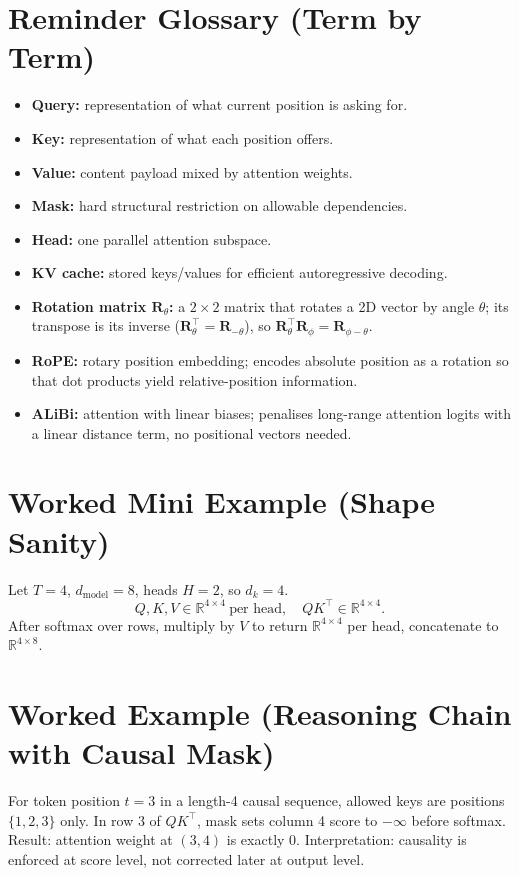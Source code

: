 \section*{Reminder Glossary (Term by Term)}
\begin{itemize}[leftmargin=1.5em]
  \item \textbf{Query:} representation of what current position is asking for.
  \item \textbf{Key:} representation of what each position offers.
  \item \textbf{Value:} content payload mixed by attention weights.
  \item \textbf{Mask:} hard structural restriction on allowable dependencies.
  \item \textbf{Head:} one parallel attention subspace.
  \item \textbf{KV cache:} stored keys/values for efficient autoregressive decoding.
  \item \textbf{Rotation matrix $\mathbf{R}_\theta$:} a $2\times2$ matrix that rotates a 2D vector by angle $\theta$; its transpose is its inverse ($\mathbf{R}_\theta^\top = \mathbf{R}_{-\theta}$), so $\mathbf{R}_\theta^\top \mathbf{R}_\phi = \mathbf{R}_{\phi-\theta}$.
  \item \textbf{RoPE:} rotary position embedding; encodes absolute position as a rotation so that dot products yield relative-position information.
  \item \textbf{ALiBi:} attention with linear biases; penalises long-range attention logits with a linear distance term, no positional vectors needed.
\end{itemize}

\section*{Worked Mini Example (Shape Sanity)}
Let $T=4$, $d_{\text{model}}=8$, heads $H=2$, so $d_k=4$.
\[
Q,K,V \in \mathbb{R}^{4\times 4}\ \text{per head},\quad QK^\top \in \mathbb{R}^{4\times 4}.
\]
After softmax over rows, multiply by $V$ to return $\mathbb{R}^{4\times 4}$ per head, concatenate to $\mathbb{R}^{4\times 8}$.

\section*{Worked Example (Reasoning Chain with Causal Mask)}
For token position $t=3$ in a length-4 causal sequence, allowed keys are positions $\{1,2,3\}$ only.  
In row 3 of $QK^\top$, mask sets column 4 score to $-\infty$ before softmax.  
Result: attention weight at $(3,4)$ is exactly 0.  
Interpretation: causality is enforced at score level, not corrected later at output level.

